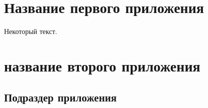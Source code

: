 \appendix
\chapter{Название первого приложения} \label{AppendixA}

Некоторый текст.

\chapter{название второго приложения} \label{AppendixB}

 \section{Подраздер приложения}\label{AppendixB1}
